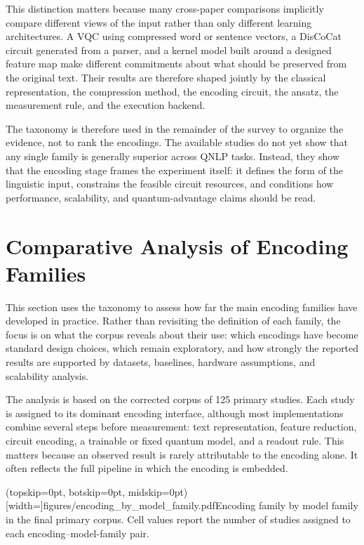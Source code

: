 \documentclass{ieeeaccess}
\begin{document}
This distinction matters because many cross-paper comparisons implicitly compare different views of the input rather than only different learning architectures. A VQC using compressed word or sentence vectors, a DisCoCat circuit generated from a parser, and a kernel model built around a designed feature map make different commitments about what should be preserved from the original text. Their results are therefore shaped jointly by the classical representation, the compression method, the encoding circuit, the ansatz, the measurement rule, and the execution backend.

The taxonomy is therefore used in the remainder of the survey to organize the evidence, not to rank the encodings. The available studies do not yet show that any single family is generally superior across QNLP tasks. Instead, they show that the encoding stage frames the experiment itself: it defines the form of the linguistic input, constrains the feasible circuit resources, and conditions how performance, scalability, and quantum-advantage claims should be read.

\section{Comparative Analysis of Encoding Families}
\label{sec:comparative_analysis}

This section uses the taxonomy to assess how far the main encoding families have developed in practice. Rather than revisiting the definition of each family, the focus is on what the corpus reveals about their use: which encodings have become standard design choices, which remain exploratory, and how strongly the reported results are supported by datasets, baselines, hardware assumptions, and scalability analysis.

The analysis is based on the corrected corpus of 125 primary studies. Each study is assigned to its dominant encoding interface, although most implementations combine several steps before measurement: text representation, feature reduction, circuit encoding, a trainable or fixed quantum model, and a readout rule. This matters because an observed result is rarely attributable to the encoding alone. It often reflects the full pipeline in which the encoding is embedded.

\Figure[t!](topskip=0pt, botskip=0pt, midskip=0pt)[width=\textwidth]{figures/encoding_by_model_family.pdf}{Encoding family by model family in the final primary corpus. Cell values report the number of studies assigned to each encoding--model-family pair.\label{fig:encoding_model_family}}
\end{document}
